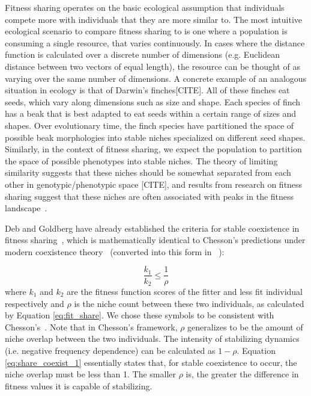 Fitness sharing operates on the basic ecological assumption that individuals compete more with individuals that they are more similar to. The most intuitive ecological scenario to compare fitness sharing to is one where a population is consuming a single resource, that varies continuously. In cases where the distance function is calculated over a discrete number of dimensions (e.g. Euclidean distance between two vectors of equal length), the resource can be thought of as varying over the same number of dimensions. A concrete example of an analogous situation in ecology is that of Darwin's finches[CITE]. All of these finches eat seeds, which vary along dimensions such as size and shape. Each species of finch has a beak that is best adapted to eat seeds within a certain range of sizes and shapes. Over evolutionary time, the finch species have partitioned the space of possible beak morphologies into stable niches specialized on different seed shapes. Similarly, in the context of fitness sharing, we expect the population to partition the space of possible phenotypes into stable niches. The theory of limiting similarity suggests that these niches should be somewhat separated from each other in genotypic/phenotypic space [CITE], and results from research on fitness sharing suggest that these niches are often associated with peaks in the fitness landscape~\cite{goldberg_genetic_1987}. 


Deb and Goldberg have already established the criteria for stable coexistence in fitness sharing~\cite{deb_investigation_1989}, which is mathematically identical to Chesson's predictions under modern coexistence theory~\cite{chesson_mechanisms_2000} (converted into this form in ~\cite{letten_linking_2017}):

\begin{equation}
\frac{k_1}{k_2} \leq \frac{1}{\rho}
\label{eq:share_coexist_1}
\end{equation}
where $k_1$ and $k_2$ are the fitness function scores of the fitter and less fit individual respectively and $\rho$ is the niche count between these two individuals, as calculated by Equation \ref{eq:fit_share}. We chose these symbols to be consistent with Chesson's~\cite{chesson_mechanisms_2000}. Note that in Chesson's framework, $\rho$ generalizes to be the amount of niche overlap between the two individuals. The intensity of stabilizing dynamics (i.e. negative frequency dependence) can be calculated as $1-\rho$. Equation \ref{eq:share_coexist_1} essentially states that, for stable coexistence to occur, the niche overlap must be less than 1. The smaller $\rho$ is, the greater the difference in fitness values it is capable of stabilizing.

